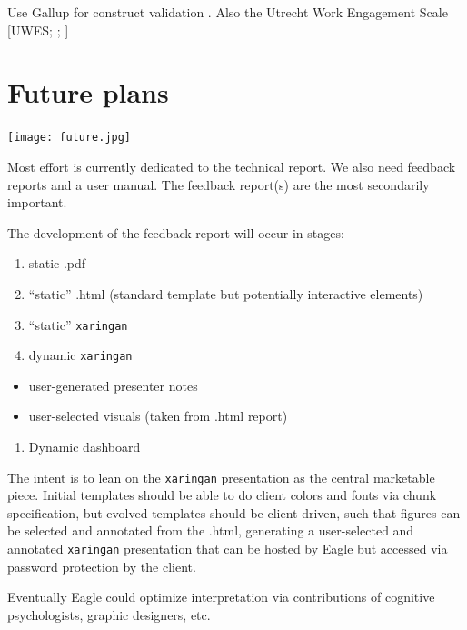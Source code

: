 \documentclass[
]{book}
\providecommand{\tightlist}{%
  \setlength{\itemsep}{0pt}\setlength{\parskip}{0pt}}
\begin{document}
Use Gallup for construct validation \citep{thackray_gallup_2005, harter_relationship_2013}. Also the Utrecht Work Engagement Scale {[}UWES; \citet{schaufeli_measurement_2002}; \citet{schaufeli_defining_2010}{]}

\hypertarget{future-plans}{%
\chapter{Future plans}\label{future-plans}}

\texttt{[image: future.jpg]}

Most effort is currently dedicated to the technical report. We also need feedback reports and a user manual. The feedback report(s) are the most secondarily important.

The development of the feedback report will occur in stages:

\begin{enumerate}
\def\labelenumi{\arabic{enumi}.}
\tightlist
\item
  static .pdf
\item
  ``static'' .html (standard template but potentially interactive elements)
\item
  ``static'' \texttt{xaringan} \citep{R-xaringan}
\item
  dynamic \texttt{xaringan}
\end{enumerate}

\begin{itemize}
\tightlist
\item
  user-generated presenter notes
\item
  user-selected visuals (taken from .html report)
\end{itemize}

\begin{enumerate}
\def\labelenumi{\arabic{enumi}.}
\setcounter{enumi}{4}
\tightlist
\item
  Dynamic dashboard
\end{enumerate}

The intent is to lean on the \texttt{xaringan} presentation as the central marketable piece. Initial templates should be able to do client colors and fonts via chunk specification, but evolved templates should be client-driven, such that figures can be selected and annotated from the .html, generating a user-selected and annotated \texttt{xaringan} presentation that can be hosted by Eagle but accessed via password protection by the client.

Eventually Eagle could optimize interpretation via contributions of cognitive psychologists, graphic designers, etc.
\end{document}
